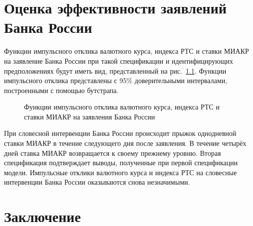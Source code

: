 \documentclass[12pt, a4paper, oneside]{extreport}
\begin{document}

\chapter{Оценка эффективности заявлений Банка России}

Функции импульсного отклика валютного курса, индекса РТС и ставки МИАКР на заявление Банка России при такой спецификации и идентифицирующих предположениях будут иметь вид, представленный на рис.~\ref{otkl_1}. Функции импульсного отклика представлены с 95\% доверительными интервалами, построенными с помощью бутстрапа.

\begin{figure}[h]
	\begin{minipage}[H]{0.49\linewidth}
	\end{minipage}
	\hfill
	\begin{minipage}[H]{0.49\linewidth}
	\end{minipage}
	\vfill
	\begin{minipage}[H]{0.49\linewidth}
	\end{minipage}
	\caption{Функции импульсного отклика валютного курса, индекса РТС и ставки МИАКР на заявления Банка России}
	\label{otkl_1}
\end{figure}

При словесной интервенции Банка России происходит прыжок однодневной ставки МИАКР в течение следующего дня после заявления. В течение четырёх дней ставка МИАКР возвращается к своему прежнему уровню. Вторая спецификация подтверждает выводы, полученные при первой спецификации модели. Импульсные отклики валютного курса и индекса РТС на словесные интервенции Банка России оказываются снова незначимыми.


\chapter*{Заключение}
\end{document}
